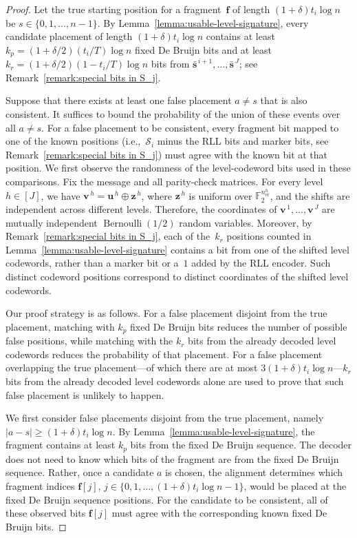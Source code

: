 \documentclass[10pt,a4paper]{amsart}
\newcommand{\boldf}{\mathbf{f}}
\newcommand{\bolds}{\mathbf{s}}
\newcommand{\boldu}{\mathbf{u}}
\newcommand{\boldv}{\mathbf{v}}
\newcommand{\boldz}{\mathbf{z}}
\newcommand{\cS}{\mathcal{S}}
\begin{document}
\begin{proof}
Let the true starting position for a fragment~$\boldf$ of length $(1+\delta)t_i\log n$ be \(s\in\{0,1,\ldots,n-1\}.\)
By Lemma~\ref{lemma:usable-level-signature}, every candidate placement of
length \((1+\delta)t_i\log n\) contains at least
\(k_{p}=(1+\delta/2)(t_i/T)\log n\) fixed De Bruijn bits and
at least
\(k_{r}=(1+\delta/2)(1-t_i/T)\log n\) bits from $\bar{\bolds}^{\,i+1},\ldots,\bar{\bolds}^{\,J}$; see Remark~\ref{remark:special bits in S_j}.

Suppose that there exists at least one false placement \(a \neq s\) that is also consistent.
It suffices to bound the probability of the union of these events over all \(a \neq s\).
For a false placement to be consistent, every fragment bit mapped to one of the known positions (i.e.,~$\cS_i$ minus the RLL bits and marker bits, see Remark~\ref{remark:special bits in S_j}) must agree with the known bit at that position. 
We first observe the randomness of the level-codeword bits used in these
comparisons. Fix the message and all parity-check matrices. For every
level \(h\in[J]\), we have
\(\boldv^{\,h}=\boldu^{\,h}\oplus\boldz^{\,h}\), where
\(\boldz^{\,h}\) is uniform over
\(\mathbb F_2^{n_{\mathrm{er}}^h}\), and the shifts are independent
across different levels. Therefore, the coordinates of
\(\boldv^{\,1},\ldots,\boldv^{\,J}\) are mutually independent
\(\operatorname{Bernoulli}(1/2)\) random variables. Moreover, by
Remark~\ref{remark:special bits in S_j}, each of the~\(k_r\) positions
counted in Lemma~\ref{lemma:usable-level-signature} contains a bit from one of the shifted level codewords, rather than a marker bit or
a~\(1\) added by the RLL encoder. Such distinct codeword positions
correspond to distinct coordinates of the shifted level codewords.

Our proof strategy is as follows. 
For a false placement disjoint from the true placement, matching with $k_{p}$ fixed De Bruijn bits reduces the number of possible false positions, while matching with the $k_{r}$ bits from the already decoded level codewords reduces the probability of that placement.
For a false placement overlapping the true placement---of which there are at most \(3(1+\delta)t_i\log n\)---$k_{r}$ bits from the already decoded level codewords alone are used to prove that such false placement is unlikely to happen.

We first consider false placements disjoint from the true placement, namely
\( |a-s|\geq(1+\delta)t_i\log n \).
By Lemma~\ref{lemma:usable-level-signature}, the fragment contains at least
\(k_p\) bits from the fixed De Bruijn sequence.
The decoder does not need to know which bits of the fragment are from the
fixed De Bruijn sequence.
Rather, once a candidate \(a\) is chosen, the alignment determines which
fragment indices
\(\boldf[j]\), \(j\in\{0,1,\ldots,(1+\delta)t_i\log n-1\}\),
would be placed at the fixed De Bruijn sequence positions.
For the candidate to be consistent, all of these observed bits
\(\boldf[j]\) must agree with the corresponding known fixed De Bruijn bits.


\end{proof}
\end{document}
